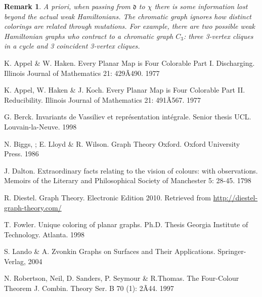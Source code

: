 \documentclass[11pt]{amsart}
\newtheorem{rmk}{Remark}[section]
\begin{document}
\begin{rmk}
A priori, when passing from ${\mathfrak{d}}$ to $\chi$ there is some information lost beyond the actual weak Hamiltonians.
The chromatic graph ignores how distinct colorings are related through mutations.
For example, there are two possible weak Hamiltonian graphs who contract to a chromatic graph $C_3$: three 3-vertex cliques in a cycle and 3 coincident 3-vertex cliques.
\end{rmk}

\begin{thebibliography}{9}

 K. Appel \& W. Haken.
Every Planar Map is Four Colorable Part I. Discharging.
Illinois Journal of Mathematics 21: 429Ã490. 1977

 K. Appel, W. Haken \& J. Koch.
Every Planar Map is Four Colorable Part II. Reducibility.
Illinois Journal of Mathematics 21: 491Ã567. 1977

G. Berck. 
Invariants de Vassiliev et repr\'esentation int\'egrale. 
Senior thesis UCL. Louvain-la-Neuve. 1998

N. Biggs, ; E. Lloyd \& R. Wilson. 
Graph Theory
Oxford. Oxford University Press. 1986

 J. Dalton. 
Extraordinary facts relating to the vision of colours: with observations. 
Memoirs of the Literary and Philosophical Society of Manchester 5: 28-45. 1798

 R. Diestel.
Graph Theory.
Electronic Edition 2010. Retrieved from \url{http://diestel-graph-theory.com/}

T. Fowler.
Unique coloring of planar graphs. 
Ph.D. Thesis Georgia Institute of Technology. Atlanta. 1998

 S. Lando \& A. Zvonkin
Graphs on Surfaces and Their Applications.
Springer-Verlag, 2004

 N. Robertson, Neil, D. Sanders, P. Seymour \& R.Thomas.
The Four-Colour Theorem 
J. Combin. Theory Ser. B 70 (1): 2Ã44. 1997

\end{thebibliography}
\end{document}
